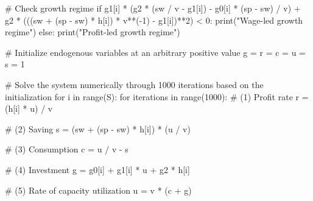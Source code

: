 \documentclass[
  letterpaper,
  DIV=11,
  numbers=noendperiod]{scrreprt}
\newenvironment{Shaded}{\begin{snugshade}}{\end{snugshade}}
\newcommand{\BuiltInTok}[1]{\textcolor[rgb]{0.00,0.23,0.31}{#1}}
\newcommand{\CommentTok}[1]{\textcolor[rgb]{0.37,0.37,0.37}{#1}}
\newcommand{\ControlFlowTok}[1]{\textcolor[rgb]{0.00,0.23,0.31}{#1}}
\newcommand{\DecValTok}[1]{\textcolor[rgb]{0.68,0.00,0.00}{#1}}
\newcommand{\KeywordTok}[1]{\textcolor[rgb]{0.00,0.23,0.31}{#1}}
\newcommand{\NormalTok}[1]{\textcolor[rgb]{0.00,0.23,0.31}{#1}}
\newcommand{\OperatorTok}[1]{\textcolor[rgb]{0.37,0.37,0.37}{#1}}
\newcommand{\StringTok}[1]{\textcolor[rgb]{0.13,0.47,0.30}{#1}}
\begin{document}
\begin{tcolorbox}
\begin{Shaded}
\begin{Highlighting}[]
    \CommentTok{\# Check growth regime}
    \ControlFlowTok{if}\NormalTok{ g1[i] }\OperatorTok{*}\NormalTok{ (g2 }\OperatorTok{*}\NormalTok{ (sw }\OperatorTok{/}\NormalTok{ v }\OperatorTok{{-}}\NormalTok{ g1[i]) }\OperatorTok{{-}}\NormalTok{ g0[i] }\OperatorTok{*}\NormalTok{ (sp }\OperatorTok{{-}}\NormalTok{ sw) }\OperatorTok{/}\NormalTok{ v) }\OperatorTok{+}\NormalTok{ g2 }\OperatorTok{*}\NormalTok{ (((sw }\OperatorTok{+}\NormalTok{ (sp }\OperatorTok{{-}}\NormalTok{ sw) }\OperatorTok{*}\NormalTok{ h[i]) }\OperatorTok{*}\NormalTok{ v}\OperatorTok{**}\NormalTok{(}\OperatorTok{{-}}\DecValTok{1}\NormalTok{) }\OperatorTok{{-}}\NormalTok{ g1[i])}\OperatorTok{**}\DecValTok{2}\NormalTok{) }\OperatorTok{\textless{}} \DecValTok{0}\NormalTok{:}
        \BuiltInTok{print}\NormalTok{(}\StringTok{"Wage{-}led growth regime"}\NormalTok{)}
    \ControlFlowTok{else}\NormalTok{:}
        \BuiltInTok{print}\NormalTok{(}\StringTok{"Profit{-}led growth regime"}\NormalTok{)}

\CommentTok{\# Initialize endogenous variables at an arbitrary positive value}
\NormalTok{g }\OperatorTok{=}\NormalTok{ r }\OperatorTok{=}\NormalTok{ c }\OperatorTok{=}\NormalTok{ u }\OperatorTok{=}\NormalTok{ s }\OperatorTok{=} \DecValTok{1}

\CommentTok{\# Solve the system numerically through 1000 iterations based on the initialization}
\ControlFlowTok{for}\NormalTok{ i }\KeywordTok{in} \BuiltInTok{range}\NormalTok{(S):}
    \ControlFlowTok{for}\NormalTok{ iterations }\KeywordTok{in} \BuiltInTok{range}\NormalTok{(}\DecValTok{1000}\NormalTok{):}
        \CommentTok{\# (1) Profit rate}
\NormalTok{        r }\OperatorTok{=}\NormalTok{ (h[i] }\OperatorTok{*}\NormalTok{ u) }\OperatorTok{/}\NormalTok{ v}

        \CommentTok{\# (2) Saving}
\NormalTok{        s }\OperatorTok{=}\NormalTok{ (sw }\OperatorTok{+}\NormalTok{ (sp }\OperatorTok{{-}}\NormalTok{ sw) }\OperatorTok{*}\NormalTok{ h[i]) }\OperatorTok{*}\NormalTok{ (u }\OperatorTok{/}\NormalTok{ v)}

        \CommentTok{\# (3) Consumption}
\NormalTok{        c }\OperatorTok{=}\NormalTok{ u }\OperatorTok{/}\NormalTok{ v }\OperatorTok{{-}}\NormalTok{ s}

        \CommentTok{\# (4) Investment}
\NormalTok{        g }\OperatorTok{=}\NormalTok{ g0[i] }\OperatorTok{+}\NormalTok{ g1[i] }\OperatorTok{*}\NormalTok{ u }\OperatorTok{+}\NormalTok{ g2 }\OperatorTok{*}\NormalTok{ h[i]}

        \CommentTok{\# (5) Rate of capacity utilization}
\NormalTok{        u }\OperatorTok{=}\NormalTok{ v }\OperatorTok{*}\NormalTok{ (c }\OperatorTok{+}\NormalTok{ g)}


\end{Highlighting}
\end{Shaded}
\end{tcolorbox}
\end{document}
